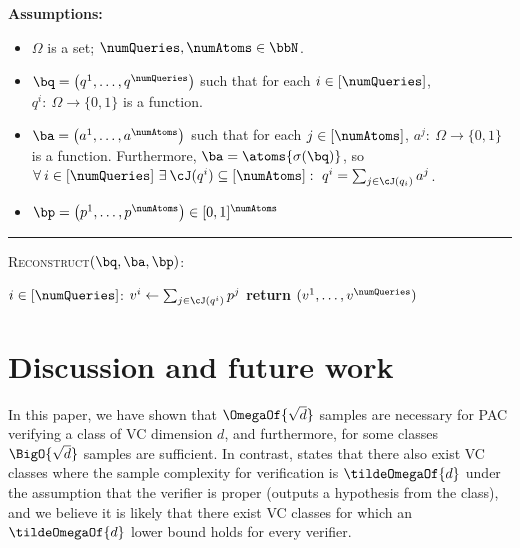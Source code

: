 \begin{protocol}[H]
	\begin{ShadedAlgorithmBox}
		{\bfseries Assumptions:}
		\begin{itemize}
			\item{$\Omega$ is a set; $\numQueries,\numAtoms \in \bbN$.}
			\item{
				$\bq = \left(q^1,\dots,q^{\numQueries}\right)$ such that for each $i \in [\numQueries]$, $q^i:\: \Omega \to \{0,1\}$ is a function.
			}
			\item{
				$\ba = \left(a^1,\dots,a^{\numAtoms}\right)$ such that for each $j \in [\numAtoms]$, $a^j:\: \Omega \to \{0,1\}$ is a function. Furthermore,
				$\ba = \atoms{\sigma(\bq)}$, so $\forall \: i \in [\numQueries]~ \exists \: \cJ(q^i) \subseteq [\numAtoms]: ~ q^i = \sum_{j \in \cJ(q_i)} a^j$.
			}
			\item{
				$\bp = \left(p^1,\dots,p^{\numAtoms}\right) \in [0,1]^{\numAtoms}$
			}
		\end{itemize}
		
		\noindent\rule{\textwidth}{0.5pt}
		
		\vspace*{0.5em}
		
		\textsc{Reconstruct}$(\bq,\ba,\bp)$:
		\begin{algorithmic}
			\For $i \in [\numQueries]$:
				\State $v^i \gets \sum_{j \in \cJ(q^i)} p^j$
			\EndFor
			\State \textbf{return} $(v^1,\dots,v^{\numQueries})$
		\end{algorithmic}
		
	\end{ShadedAlgorithmBox}
	\caption{A subroutine of \cref{protocol:sq-verifier-iteration}. Compute the evaluations for a collection of statistical queries $\bq$ with atoms $\ba$ given evaluations $\bp$ for the atoms.}
	\label{protocol:sq-reconstruct-valuations}
\end{protocol}

\section{Discussion and future work}

In this paper, we have shown that $\OmegaOf{\sqrt{d}}$ samples are necessary for PAC verifying a class of VC dimension $d$, and furthermore, for some classes $\BigO{\sqrt{d}}$ samples are sufficient. In contrast, %
\cite[Lemma 4.1]{GoldwasserRSY21}  %
states that there also exist VC classes where the sample complexity for verification
is $\tildeOmegaOf{d}$ under the assumption that the verifier is proper (outputs a hypothesis from the class), and we believe it is likely that there exist VC classes for which an $\tildeOmegaOf{d}$ lower bound holds for every verifier. 

